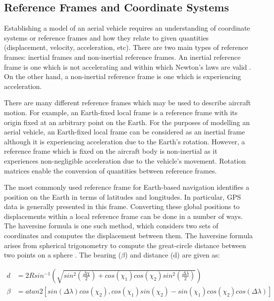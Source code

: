 \subsection{Reference Frames and Coordinate Systems}\label{section:RefFrames}
Establishing a model of an aerial vehicle requires an understanding of coordinate systems or reference frames and how they relate to given quantities (displacement, velocity, acceleration, etc). There are two main types of reference frames: inertial frames and non-inertial reference frames. An inertial reference frame is one which is not accelerating and within which Newton's laws are valid \cite{Nebylov2016}. On the other hand, a non-inertial reference frame is one which is experiencing acceleration.

There are many different reference frames which may be used to describe aircraft motion. For example, an Earth-fixed local frame is a reference frame with its origin fixed at an arbitrary point on the Earth. For the purposes of modelling an aerial vehicle, an Earth-fixed local frame can be considered as an inertial frame although it is experiencing acceleration due to the Earth's rotation. However, a reference frame which is fixed on the aircraft body is non-inertial as it experiences non-negligible acceleration due to the vehicle's movement. Rotation matrices enable the conversion of quantities between reference frames.

The most commonly used reference frame for Earth-based navigation identifies a position on the Earth in terms of latitudes and longitudes. In particular, GPS data is generally presented in this frame. Converting these global positions to displacements within a local reference frame can be done in a number of ways. The haversine formula is one such method, which considers two sets of coordinates and computes the displacement between them. The haversine formula arises from spherical trigonometry to compute the great-circle distance between two points on a sphere \cite{Smart1977}. The bearing ($\beta$) and distance (d) are given as:

\begin{equation}\label{eqn:haversine}
\begin{split}
d&=2R sin^{-1} \left( \sqrt{sin^{2}\left( \frac{\Delta\chi}{2} \right) +cos(\chi_{1})cos(\chi_{2})sin^{2} \left( \frac{\Delta\lambda}{2}  \right) }\right)\\
\beta&=atan2\left[ sin(\Delta\lambda)cos(\chi_{2}) , cos(\chi_{1})sin(\chi_{2}) - sin(\chi_{1}) cos(\chi_2) cos(\Delta\lambda)\right]
\end{split}
\end{equation}

